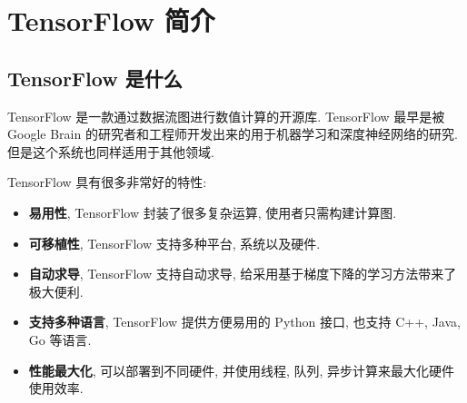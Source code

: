 

\section{TensorFlow 简介}
\subsection{TensorFlow 是什么}
\begin{frame}{\insertsection}{\insertsubsection}
    TensorFlow 是一款通过数据流图进行数值计算的开源库. TensorFlow 最早是被 Google Brain 的研究者和工程师开发出来的用于机器学习和深度神经网络的研究. 但是这个系统也同样适用于其他领域.

    TensorFlow 具有很多非常好的特性:%
    \begin{itemize}
        \item \textbf{易用性}, TensorFlow 封装了很多复杂运算, 使用者只需构建计算图.
        \item \textbf{可移植性}, TensorFlow 支持多种平台, 系统以及硬件.
        \item \textbf{自动求导}, TensorFlow 支持自动求导, 给采用基于梯度下降的学习方法带来了极大便利.
        \item \textbf{支持多种语言}, TensorFlow 提供方便易用的 Python 接口, 也支持 C++, Java, Go 等语言.
        \item \textbf{性能最大化}, 可以部署到不同硬件, 并使用线程, 队列, 异步计算来最大化硬件使用效率.
    \end{itemize}
\end{frame}


